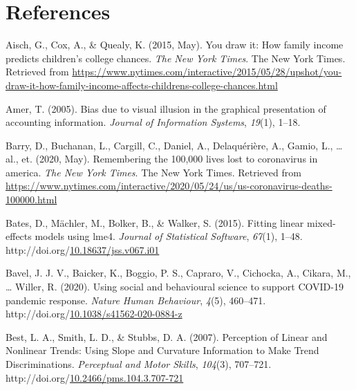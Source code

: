 \documentclass[print]{nuthesis}
\newlength{\cslhangindent}
\newenvironment{CSLReferences}%
{\setlength{\parindent}{0pt}%
\everypar{\setlength{\hangindent}{\cslhangindent}}\ignorespaces}%
{\par}
\begin{document}
\backmatter

\hypertarget{references}{%
\chapter*{References}\label{references}}

\noindent

\setlength{\parindent}{-0.20in}
\setlength{\leftskip}{0.20in}
\setlength{\parskip}{8pt}

\hypertarget{refs}{}
\begin{CSLReferences}{1}{0}
\leavevmode\hypertarget{ref-aisch_cox_quealy_2015}{}%
Aisch, G., Cox, A., \& Quealy, K. (2015, May). You draw it: How family income predicts children's college chances. \emph{The New York Times}. The New York Times. Retrieved from \url{https://www.nytimes.com/interactive/2015/05/28/upshot/you-draw-it-how-family-income-affects-childrens-college-chances.html}

\leavevmode\hypertarget{ref-amer2005bias}{}%
Amer, T. (2005). Bias due to visual illusion in the graphical presentation of accounting information. \emph{Journal of Information Systems}, \emph{19}(1), 1--18.

\leavevmode\hypertarget{ref-NYTrememberinglives}{}%
Barry, D., Buchanan, L., Cargill, C., Daniel, A., Delaquérière, A., Gamio, L., \ldots{} al., et. (2020, May). Remembering the 100,000 lives lost to coronavirus in america. \emph{The New York Times}. The New York Times. Retrieved from \url{https://www.nytimes.com/interactive/2020/05/24/us/us-coronavirus-deaths-100000.html}

\leavevmode\hypertarget{ref-lme4}{}%
Bates, D., Mächler, M., Bolker, B., \& Walker, S. (2015). Fitting linear mixed-effects models using {lme4}. \emph{Journal of Statistical Software}, \emph{67}(1), 1--48. http://doi.org/\href{https://doi.org/10.18637/jss.v067.i01}{10.18637/jss.v067.i01}

\leavevmode\hypertarget{ref-bavel_using_2020}{}%
Bavel, J. J. V., Baicker, K., Boggio, P. S., Capraro, V., Cichocka, A., Cikara, M., \ldots{} Willer, R. (2020). Using social and behavioural science to support {COVID}-19 pandemic response. \emph{Nature Human Behaviour}, \emph{4}(5), 460--471. http://doi.org/\href{https://doi.org/10.1038/s41562-020-0884-z}{10.1038/s41562-020-0884-z}

\leavevmode\hypertarget{ref-best_perception_2007}{}%
Best, L. A., Smith, L. D., \& Stubbs, D. A. (2007). Perception of {Linear} and {Nonlinear} {Trends}: {Using} {Slope} and {Curvature} {Information} to {Make} {Trend} {Discriminations}. \emph{Perceptual and Motor Skills}, \emph{104}(3), 707--721. http://doi.org/\href{https://doi.org/10.2466/pms.104.3.707-721}{10.2466/pms.104.3.707-721}


\end{CSLReferences}
\end{document}
